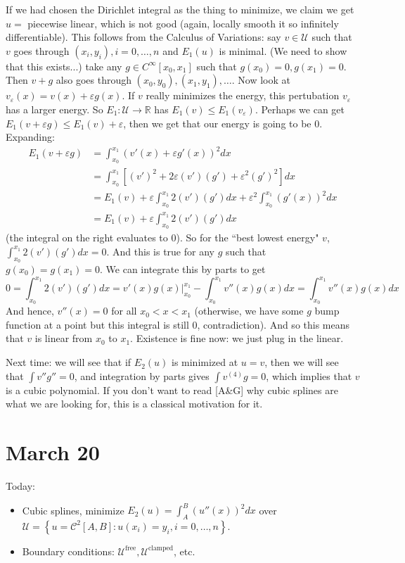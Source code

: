 \documentclass{article}
\theoremstyle{plain}
\theoremstyle{remark}
\newcommand{\R}{{\mathbb R}}
\newcommand{\ep}{{\varepsilon}}
\begin{document}
If we had chosen the Dirichlet integral as the thing to minimize,
we claim we get $u = $ piecewise linear, which is not good
(again, locally smooth it so infinitely differentiable).
This follows from the Calculus of Variations:
say $v \in \mathcal{U}$ such that $v$ goes through
$(x_i,y_i), i = 0,\dots,n$ and $E_1(u)$ is minimal.
(We need to show that this exists...)
take any $g \in C^\infty [x_0,x_1]$ such that $g(x_0) = 0, g(x_1) = 0$.
Then $v + g$ also goes through $(x_0,y_0),(x_1,y_1),\dots$.
Now look at $v_\ep(x) = v(x) + \ep g(x)$.
If $v$ really minimizes the energy, this pertubation $v_\ep$ has a larger energy.
So $E_1 \colon \mathcal{U} \to \R$ has $E_1(v) \leq E_1(v_\ep)$.
Perhaps we can get $E_1(v+\ep g) \leq E_1(v) + \ep$,
then we get that our energy is going to be $0$. Expanding:
\begin{align*}
	E_1(v + \ep g)
	&= \int_{x_0}^{x_1} (v'(x) + \ep g'(x))^2 dx\\
	&= \int_{x_0}^{x_1} \left[ (v')^2 + 2\ep(v')(g') + \ep^2 (g')^2 \right]dx\\
	&= E_1(v) + \ep \int_{x_0}^{x_1} 2(v')(g')dx + \ep^2\int_{x_0}^{x_1} (g'(x))^2dx\\
	&= E_1(v) + \ep \int_{x_0}^{x_1} 2(v')(g')dx
\end{align*}
(the integral on the right evaluates to $0$).
So for the ``best lowest energy" $v$,
$\int_{x_0}^{x_1} 2(v')(g')dx = 0$.
And this is true for any $g$ such that $g(x_0) = g(x_1) = 0$.
We can integrate this by parts to get
\[
	0 = \int_{x_0}^{x_1} 2(v')(g')dx = v'(x)g(x) \big\vert_{x_0}^{x_1}
	- \int_{x_0}^{x_1} v''(x)g(x)dx
	= \int_{x_0}^{x_1} v''(x)g(x)dx
\]
And hence, $v''(x) = 0$ for all $x_0 < x < x_1$
(otherwise, we have some $g$ bump function at a point
but this integral is still $0$, contradiction).
And so this means that $v$ is linear from $x_0$ to $x_1$.
Existence is fine now: we just plug in the linear.

Next time: we will see that if $E_2(u)$ is minimized at $u = v$,
then we will see that $\int v'' g'' = 0$, and integration by parts gives
$\int v^{(4)}g = 0$, which implies that $v$ is a cubic polynomial.
If you don't want to read [A\&G] why cubic splines are what we are looking for,
this is a classical motivation for it.


\section{March 20}
Today:
\begin{itemize}
	\item Cubic splines, minimize $E_2(u) = \int_A^B (u''(x))^2dx$ over
		$\mathcal{U} = \left\{u = \mathcal{C}^2[A,B] \colon u(x_i) = y_i, i =0,\dots,n\right\}$.
	\item Boundary conditions: $\mathcal{U}^{\text{free}}, \mathcal{U}^{\text{clamped}}$, etc.
\end{itemize}
\end{document}
